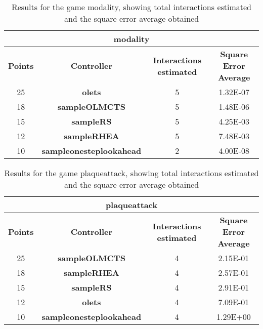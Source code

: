 \begin{table*}[!t]
\begin{center}
\begin{adjustbox}{width=1\textwidth}
\begin{tabular}{|c|c|c|c|}
\hline
\multicolumn{4}{|c|}{\textbf{modality}}\\
\hline
\textbf{Points} & \textbf{Controller} & \textbf{Interactions estimated} & \textbf{Square Error Average}\\
\hline
25 & \textbf{olets} & 5 & 1.32E-07
 \\
\hline
18 & \textbf{sampleOLMCTS} & 5 & 1.48E-06
 \\
\hline
15 & \textbf{sampleRS} & 5 & 4.25E-03
 \\
\hline
12 & \textbf{sampleRHEA} & 5 & 7.48E-03
 \\
\hline
10 & \textbf{sampleonesteplookahead} & 2 & 4.00E-08
 \\
\hline
\end{tabular}
\end{adjustbox}
\caption{Results for the game modality, showing total interactions estimated and the square error average obtained}
\label{tab:weights}
\end{center}
\end{table*}
\begin{table*}[!t]
\begin{center}
\begin{adjustbox}{width=1\textwidth}
\begin{tabular}{|c|c|c|c|}
\hline
\multicolumn{4}{|c|}{\textbf{plaqueattack}}\\
\hline
\textbf{Points} & \textbf{Controller} & \textbf{Interactions estimated} & \textbf{Square Error Average}\\
\hline
25 & \textbf{sampleOLMCTS} & 4 & 2.15E-01
 \\
\hline
18 & \textbf{sampleRHEA} & 4 & 2.57E-01
 \\
\hline
15 & \textbf{sampleRS} & 4 & 2.91E-01
 \\
\hline
12 & \textbf{olets} & 4 & 7.09E-01
 \\
\hline
10 & \textbf{sampleonesteplookahead} & 4 & 1.29E+00
 \\
\hline
\end{tabular}
\end{adjustbox}
\caption{Results for the game plaqueattack, showing total interactions estimated and the square error average obtained}
\label{tab:weights}
\end{center}
\end{table*}
